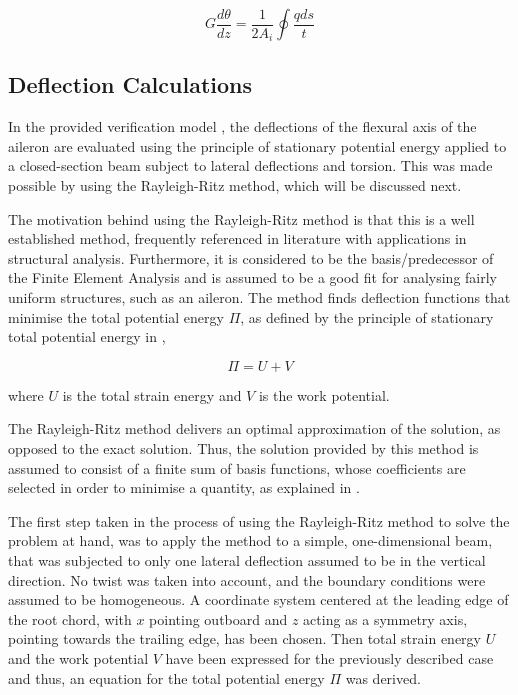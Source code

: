 \begin{equation}
\label{Gdtheta}
    G \frac{d \theta}{d z}=\frac{1}{2 A_{i}} \oint \frac{q d s}{t}
\end{equation}
\subsection{Deflection Calculations}
\label{subsec:deflection_calculations}
In the provided verification model \cite{Verification_model_description}, the deflections of the flexural axis of the aileron are evaluated using the principle of stationary potential energy applied to a closed-section beam subject to lateral deflections and torsion. This was made possible by using the Rayleigh-Ritz method, which will be discussed next.

\noindent The motivation behind using the Rayleigh-Ritz method is that this is a well established method, frequently referenced in literature with applications in structural analysis. Furthermore, it is considered to be the basis/predecessor of the Finite Element Analysis and is assumed to be a good fit for analysing fairly uniform structures, such as an aileron. The method finds deflection functions that minimise the total potential energy $\Pi$, as defined by the principle of stationary total potential energy in ,

\begin{equation}
\label{eq:total_potential_energy}
    \Pi= U + V
\end{equation}

\noindent where $U$ is the total strain energy and $V$ is the work potential.

The Rayleigh-Ritz method delivers an optimal approximation of the solution, as opposed to the exact solution. Thus, the solution provided by this method is assumed to consist of a finite sum of basis functions, whose coefficients are selected in order to minimise a quantity, as explained in \cite{Verification_model_description}. 

The first step taken in the process of using the Rayleigh-Ritz method to solve the problem at hand, was to apply the method to a simple, one-dimensional beam, that was subjected to only one lateral deflection assumed to be in the vertical direction. No twist was taken into account, and the boundary conditions were assumed to be homogeneous. A coordinate system centered at the leading edge of the root chord, with $x$ pointing outboard and $z$ acting as a symmetry axis, pointing towards the trailing edge, has been chosen. Then total strain energy $U$ and the work potential $V$ have been expressed for the previously described case and thus, an equation for the total potential energy $\Pi$ was derived.

